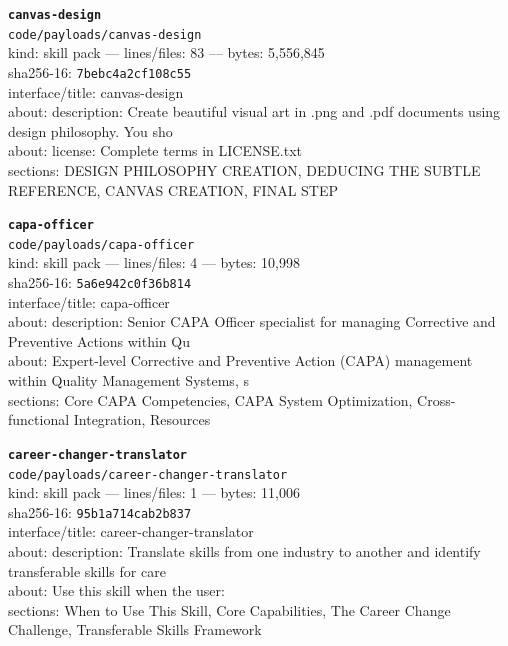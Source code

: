 \noindent\textbf{\texttt{canvas-design}}\\
\texttt{code/payloads/canvas-design}\\
kind: skill pack --- lines/files: 83 --- bytes: 5,556,845\\
sha256-16: \texttt{7bebc4a2cf108c55}\\
interface/title: canvas-design\\
about: description: Create beautiful visual art in .png and .pdf documents using design philosophy. You sho\\
about: license: Complete terms in LICENSE.txt\\
sections: DESIGN PHILOSOPHY CREATION, DEDUCING THE SUBTLE REFERENCE, CANVAS CREATION, FINAL STEP\\
\vspace*{6.0pt}

\noindent\textbf{\texttt{capa-officer}}\\
\texttt{code/payloads/capa-officer}\\
kind: skill pack --- lines/files: 4 --- bytes: 10,998\\
sha256-16: \texttt{5a6e942c0f36b814}\\
interface/title: capa-officer\\
about: description: Senior CAPA Officer specialist for managing Corrective and Preventive Actions within Qu\\
about: Expert-level Corrective and Preventive Action (CAPA) management within Quality Management Systems, s\\
sections: Core CAPA Competencies, CAPA System Optimization, Cross-functional Integration, Resources\\
\vspace*{6.0pt}

\noindent\textbf{\texttt{career-changer-translator}}\\
\texttt{code/payloads/career-changer-translator}\\
kind: skill pack --- lines/files: 1 --- bytes: 11,006\\
sha256-16: \texttt{95b1a714cab2b837}\\
interface/title: career-changer-translator\\
about: description: Translate skills from one industry to another and identify transferable skills for care\\
about: Use this skill when the user:\\
sections: When to Use This Skill, Core Capabilities, The Career Change Challenge, Transferable Skills Framework\\
\vspace*{6.0pt}
\newpage


